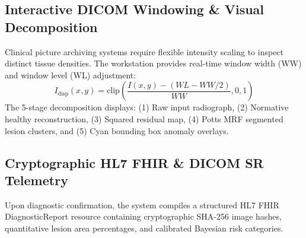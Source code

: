 \documentclass[conference]{IEEEtran}
\begin{document}
\begin{table}[!t]
\caption{Characteristics and Operational Performance of Modular Hybrid Sockets Across 25,596 Test Scans.}
\label{tab:modular_sockets}
\centering
\footnotesize
\setlength{\tabcolsep}{2.5pt}
\end{table}

\subsection{Interactive DICOM Windowing \& Visual Decomposition}
Clinical picture archiving systems require flexible intensity scaling to inspect distinct tissue densities. The workstation provides real-time window width (WW) and window level (WL) adjustment:
\begin{equation}
I_{\text{disp}}(x, y) = \text{clip}\left(\frac{I(x, y) - (WL - WW/2)}{WW}, 0, 1\right)
\end{equation}
The 5-stage decomposition displays: (1) Raw input radiograph, (2) Normative healthy reconstruction, (3) Squared residual map, (4) Potts MRF segmented lesion clusters, and (5) Cyan bounding box anomaly overlays.

\subsection{Cryptographic HL7 FHIR \& DICOM SR Telemetry}
Upon diagnostic confirmation, the system compiles a structured HL7 FHIR DiagnosticReport resource containing cryptographic SHA-256 image hashes, quantitative lesion area percentages, and calibrated Bayesian risk categories.
\end{document}
